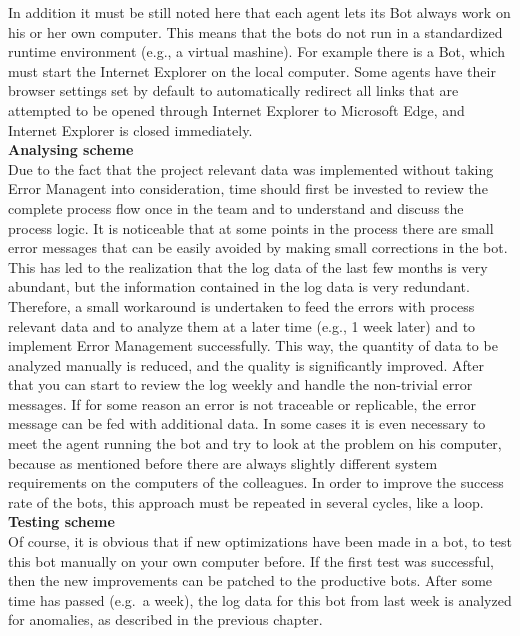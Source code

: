 In addition it must be still noted here that each agent lets its Bot always work on his or her own computer.
This means that the bots do not run in a standardized runtime environment (e.g., a virtual mashine).
For example there is a Bot, which must start the Internet Explorer on the local computer.
Some agents have their browser settings set by default to automatically redirect all links that are attempted to be
opened through Internet Explorer to Microsoft Edge, and Internet Explorer is closed immediately.\\

\textbf{Analysing scheme}\\
Due to the fact that the project relevant data was implemented without taking Error Managent into consideration, time
should first be invested to review the complete process flow once in the team and to understand and discuss the process
logic.
It is noticeable that at some points in the process there are small error messages that can be easily avoided by making
small corrections in the bot.
This has led to the realization that the log data of the last few months is very abundant, but the information contained
in the log data is very redundant.
Therefore, a small workaround is undertaken to feed the errors with process relevant data and to analyze them at a later
time (e.g., 1 week later) and to implement Error Management successfully.
This way, the quantity of data to be analyzed manually
is reduced, and the quality is significantly improved.
After that you can start to review the log weekly and handle the non-trivial error messages.
If for some reason an error is not traceable or replicable, the error message can be fed with additional data.
In some cases it is even necessary to meet the agent running the bot and try to look at the problem on his computer,
because as mentioned before there are always slightly different system requirements on the computers of the colleagues.
In order to improve the success rate of the bots, this approach must be repeated in several cycles,
like a loop.\\

\textbf{Testing scheme}\\
Of course, it is obvious that if new optimizations have been made in a bot, to test this bot manually on your own
computer before.
If the first test was successful, then the new improvements can be patched to the productive bots.
After some time has passed (e.g.\ a week), the log data for this bot from last week is analyzed for anomalies, as
described in the previous chapter.

